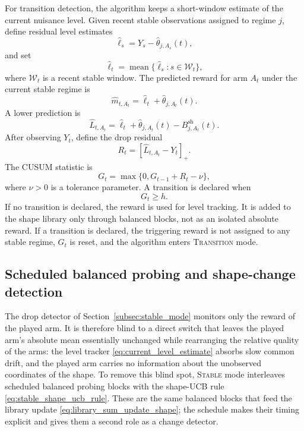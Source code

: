 \documentclass[11pt]{article}
\newcommand{\pos}[1]{\left[#1\right]_{+}}
\begin{document}
For transition detection, the algorithm keeps a short-window estimate of the current nuisance level. Given recent stable observations assigned to regime $j$, define residual level estimates
\begin{equation}
\label{eq:level_residuals}
\widehat\ell_s
=
Y_s-\widehat\theta_{j,A_s}(t),
\end{equation}
and set
\begin{equation}
\label{eq:current_level_estimate}
\widehat\ell_t
=
\operatorname{mean}\{\widehat\ell_s: s\in\mathcal W_t\},
\end{equation}
where $\mathcal W_t$ is a recent stable window. The predicted reward for arm $A_t$ under the current stable regime is
\begin{equation}
\label{eq:stable_prediction}
\widehat m_{t,A_t}
=
\widehat\ell_t+\widehat\theta_{j,A_t}(t).
\end{equation}
A lower prediction is
\begin{equation}
\label{eq:lower_prediction}
\widehat L_{t,A_t}
=
\widehat\ell_t+
\widehat\theta_{j,A_t}(t)-B_{j,A_t}^{\mathrm{sh}}(t).
\end{equation}
After observing $Y_t$, define the drop residual
\begin{equation}
\label{eq:drop_residual}
R_t
=
\pos{\widehat L_{t,A_t}-Y_t}.
\end{equation}
The CUSUM statistic is
\begin{equation}
\label{eq:cusum}
G_t
=
\max\{0,G_{t-1}+R_t-\nu\},
\end{equation}
where $\nu>0$ is a tolerance parameter. A transition is declared when
\begin{equation}
\label{eq:transition_alarm}
G_t\geq h.
\end{equation}
If no transition is declared, the reward is used for level tracking. It is added to the shape library only through balanced blocks, not as an isolated absolute reward. If a transition is declared, the triggering reward is not assigned to any stable regime, $G_t$ is reset, and the algorithm enters \textsc{Transition} mode.

\subsection{Scheduled balanced probing and shape-change detection}
\label{subsec:shape_detector}

The drop detector of Section~\ref{subsec:stable_mode} monitors only the reward of the played arm. It is therefore blind to a direct switch that leaves the played arm's absolute mean essentially unchanged while rearranging the relative quality of the arms: the level tracker \eqref{eq:current_level_estimate} absorbs slow common drift, and the played arm carries no information about the unobserved coordinates of the shape. To remove this blind spot, \textsc{Stable} mode interleaves scheduled balanced probing blocks with the shape-UCB rule \eqref{eq:stable_shape_ucb_rule}. These are the same balanced blocks that feed the library update \eqref{eq:library_sum_update_shape}; the schedule makes their timing explicit and gives them a second role as a change detector.
\end{document}
